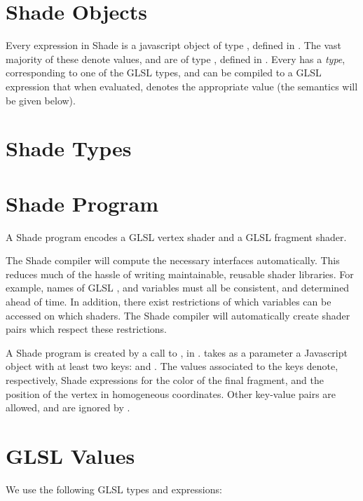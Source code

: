 \documentclass{article}
\begin{document}
\section{Shade Objects}

Every expression in Shade is a javascript object of type ,
defined in . The vast majority of these denote
values, and are of type , defined in
.  Every  has a \emph{type},
corresponding to one of the GLSL types, and can be compiled to a GLSL
expression that when evaluated, denotes the appropriate value (the
semantics will be given below).


\section{Shade Types}


\section{Shade Program}

A Shade program encodes a GLSL vertex shader and a GLSL fragment
shader. 

The Shade compiler will compute the necessary interfaces
automatically. This reduces much of the hassle of writing
maintainable, reusable shader libraries. For example, names of GLSL
,  and  variables must all be consistent,
and determined ahead of time. In addition, there exist restrictions of
which variables can be accessed on which shaders. The Shade compiler
will automatically create shader pairs which respect these
restrictions.

A Shade program is created by a call to , in
.  takes as a parameter a
Javascript object with at least two keys:  and . The
values associated to the keys denote, respectively, Shade expressions
for the color of the final fragment, and the position of the vertex in
homogeneous coordinates. Other key-value pairs are allowed, and are
ignored by .

\section{GLSL Values}

We use the following GLSL types and expressions:
\end{document}

